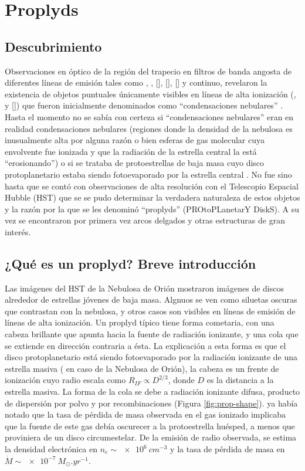 \section{Proplyds}
\subsection{Descubrimiento}
Observaciones en óptico de la región del trapecio en filtros de banda angosta de diferentes líneas de emisión tales como , , [], [], [] y continuo, revelaron la existencia de objetos puntuales únicamente visibles en líneas de alta ionización (,  y []) que fueron inicialmente denominados como ``condensaciones nebulares'' \citep{Laques:1979}. Hasta el momento no se sabía con certeza si ``condensaciones nebulares'' eran en realidad condensaciones nebulares (regiones donde la densidad de la nebulosa es inusualmente alta por alguna razón o bien esferas de gas molecular cuya envolvente fue ionizada y que la radiación de la estrella central la está ``erosionando'') o si se trataba de protoestrellas de baja masa cuyo disco protoplanetario estaba siendo fotoevaporado por la estrella central \citep{churchwell:1987}. No fue sino hasta que se contó con observaciones de alta resolución con el Telescopio Espacial Hubble (HST) que se se pudo determinar la verdadera naturaleza de estos objetos \citep{ODell:1993} y la razón por la que se les denominó ``proplyds'' (PROtoPLanetarY DiskS). A su vez se encontraron por primera vez arcos delgados y otras estructuras de gran interés.

\subsection{¿Qué es un proplyd? Breve introducción \citep{Johnstone:1998}}

Las imágenes del HST de la Nebulosa de Orión mostraron imágenes de discos alrededor de estrellas jóvenes de baja masa. Algnuos se ven como siluetas oscuras que contrastan con la nebulosa, y otros casos son visibles en líneas de emisión de líneas de alta ionización. Un proplyd típico tiene forma cometaria, con una cabeza brillante que apunta hacia la fuente de radiación ionizante, y una cola que se extiende en dirección contraria a ésta. La explicación a esta forma es que el disco protoplanetario está siendo fotoevaporado por la radiación ionizante de una estrella masiva (\thC{} en caso de la Nebulosa de Orión), la cabeza es un frente de ionización cuyo radio escala como $R_{IF} \propto D^{2/3}$, donde $D$ es la distancia a la estrella masiva. La forma de la cola se debe a radiación ionizante difusa, producto de dispersión por polvo y por recombinaciones (Figura \ref{fig:prop-shape}). \citet{churchwell:1987} ya había notado que la tasa de pérdida de masa observada
en el gas ionizado implicaba que la fuente de este gas debía oscurecer a la protoestrella huésped, a menos que proviniera de un disco circumestelar. De la
emisión de radio observada, se estima la densidad electrónica en $n_e \sim \SI{e6}{cm^{-3}}$ y la tasa de pérdida de masa en $\dot{M} \sim \SI{e-7}{M_\odot.yr^{-1}}$.

